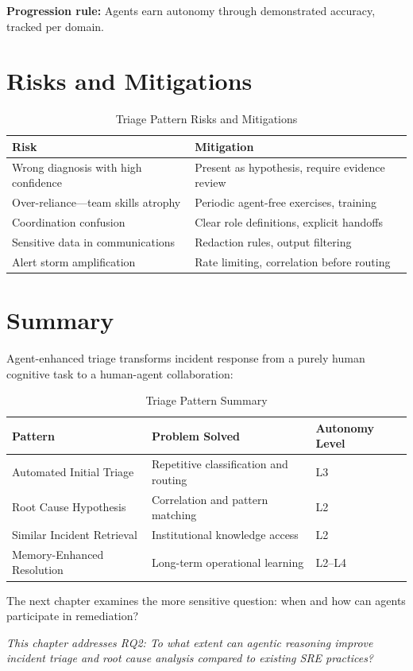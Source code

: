 \textbf{Progression rule:} Agents earn autonomy through demonstrated accuracy, tracked per domain.

\section{Risks and Mitigations}
\label{sec:triage-risks}

\begin{table}[htbp]
\centering
\caption{Triage Pattern Risks and Mitigations}
\label{tab:triage-risks}
\begin{tabular}{ll}
\toprule
\textbf{Risk} & \textbf{Mitigation} \\
\midrule
Wrong diagnosis with high confidence & Present as hypothesis, require evidence review \\
Over-reliance---team skills atrophy & Periodic agent-free exercises, training \\
Coordination confusion & Clear role definitions, explicit handoffs \\
Sensitive data in communications & Redaction rules, output filtering \\
Alert storm amplification & Rate limiting, correlation before routing \\
\bottomrule
\end{tabular}
\end{table}

\section{Summary}
\label{sec:triage-summary}

Agent-enhanced triage transforms incident response from a purely human cognitive task to a human-agent collaboration:

\begin{table}[htbp]
\centering
\caption{Triage Pattern Summary}
\label{tab:triage-summary}
\begin{tabular}{lll}
\toprule
\textbf{Pattern} & \textbf{Problem Solved} & \textbf{Autonomy Level} \\
\midrule
Automated Initial Triage & Repetitive classification and routing & L3 \\
Root Cause Hypothesis & Correlation and pattern matching & L2 \\
Similar Incident Retrieval & Institutional knowledge access & L2 \\
Memory-Enhanced Resolution & Long-term operational learning & L2--L4 \\
\bottomrule
\end{tabular}
\end{table}

The next chapter examines the more sensitive question: when and how can agents participate in remediation?

\textit{This chapter addresses RQ2: To what extent can agentic reasoning improve incident triage and root cause analysis compared to existing SRE practices?}
